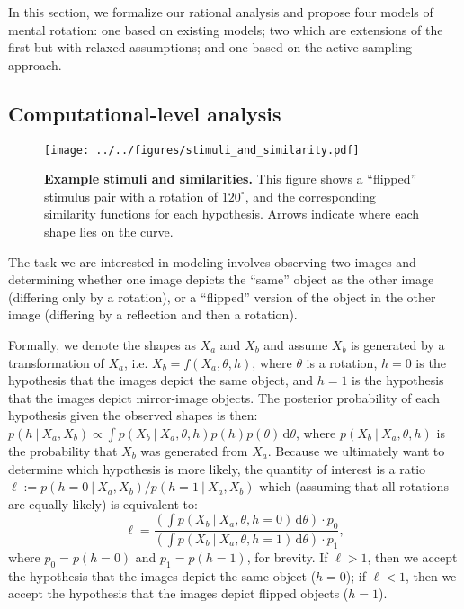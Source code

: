 \documentclass[10pt,letterpaper]{article}
\newcommand{\hi}[0]{h=0}
\newcommand{\hf}[0]{h=1}
\newcommand{\dif}[0]{\,\mathrm{d}}
\begin{document}
In this section, we formalize our rational analysis and propose four
models of mental rotation: one based on existing models; two which are
extensions of the first but with relaxed assumptions; and one based on
the active sampling approach.

\subsection{Computational-level analysis}

\begin{figure}[t]
  \begin{center}
    \texttt{[image: ../../figures/stimuli\_and\_similarity.pdf]}
    \caption{\textbf{Example stimuli and similarities.} This figure
      shows a ``flipped'' stimulus pair with a rotation of
      $120^\circ$, and the corresponding similarity functions for each
      hypothesis. Arrows indicate where each shape lies on the curve.}
    \label{fig:shapes}
  \end{center}
\end{figure}

The task we are interested in modeling involves observing two images
and determining whether one image depicts the ``same'' object as the
other image (differing only by a rotation), or a ``flipped'' version
of the object in the other image (differing by a reflection and then a
rotation).

Formally, we denote the shapes as $X_a$ and $X_b$ and assume $X_b$ is
generated by a transformation of $X_a$, i.e. $X_b=f(X_a, \theta, h)$,
where $\theta$ is a rotation, $\hi$ is the hypothesis that the images
depict the same object, and $\hf$ is the hypothesis that the images
depict mirror-image objects. The posterior probability of each
hypothesis given the observed shapes is then: $p(h\ \vert\ X_a, X_b)
\propto \int p(X_b\ \vert\ X_a, \theta, h)p(h)p(\theta)\dif\theta$,
where $p(X_b\ \vert\ X_a, \theta, h)$ is the probability that $X_b$
was generated from $X_a$. Because we ultimately want to determine
which hypothesis is more likely, the quantity of interest is a ratio
$\ell:=p(\hi\ \vert\ X_a, X_b) / p(\hf\ \vert\ X_a, X_b)$ which
(assuming that all rotations are equally likely) is equivalent to:
\begin{equation}
  \ell = \frac{\left(\int p(X_b\ \vert\ X_a, \theta, \hi)\dif\theta\right)\cdot{}p_0}{\left(\int p(X_b\ \vert\ X_a, \theta, \hf)\dif\theta\right)\cdot{}p_1},
  \label{eq:lh-ratio}
\end{equation}
where $p_0=p(h=0)$ and $p_1=p(h=1)$, for brevity. If $\ell > 1$, then
we accept the hypothesis that the images depict the same object
($\hi$); if $\ell < 1$, then we accept the hypothesis that the images
depict flipped objects ($\hf$).
\end{document}
